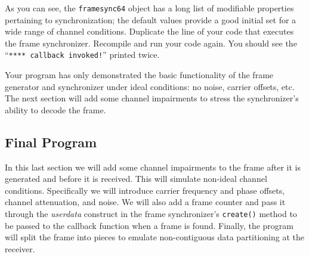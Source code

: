 %
As you can see, the {\tt framesync64} object has a long list of
modifiable properties pertaining to synchronization;
the default values provide a good initial set for a wide range of
channel conditions.
Duplicate the line of your code that executes the frame synchronizer.
Recompile and run your code again.
You should see the ``{\tt ***** callback invoked!}'' printed twice.

Your program has only demonstrated the basic functionality of the frame
generator and synchronizer under ideal conditions:
no noise, carrier offsets, etc.
The next section will add some channel impairments to stress the
synchronizer's ability to decode the frame.


%
%
\subsection{Final Program}
\label{tutorial:framing:completed}

In this last section we will add some channel impairments to the frame
after it is generated and before it is received.
This will simulate non-ideal channel conditions.
Specifically we will introduce carrier frequency and phase offsets,
channel attenuation, and noise.
We will also add a frame counter and pass it through the {\em userdata}
construct in the frame synchronizer's {\tt create()} method to be passed
to the callback function when a frame is found.
Finally, the program will split the frame into pieces to emulate
non-contiguous data partitioning at the receiver.

